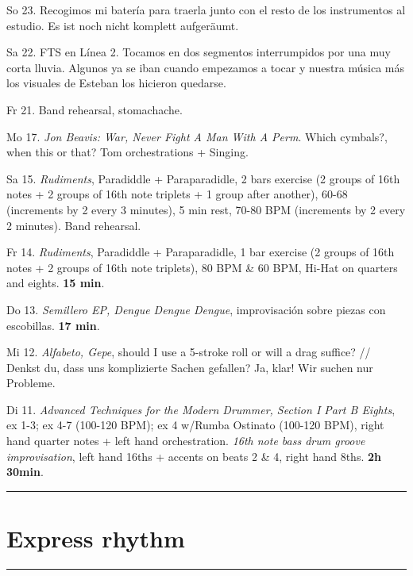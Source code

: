 \documentclass[
]{book}
\begin{document}
So 23. Recogimos mi batería para traerla junto con el resto de los instrumentos al estudio. Es ist noch nicht komplett aufgeräumt.

Sa 22. FTS en Línea 2. Tocamos en dos segmentos interrumpidos por una muy corta lluvia. Algunos ya se iban cuando empezamos a tocar y nuestra música más los visuales de Esteban los hicieron quedarse.

Fr 21. Band rehearsal, stomachache.

Mo 17. \emph{Jon Beavis: War, Never Fight A Man With A Perm}. Which cymbals?, when this or that? Tom orchestrations + Singing.

Sa 15. \emph{Rudiments}, Paradiddle + Paraparadidle, 2 bars exercise (2 groups of 16th notes + 2 groups of 16th note triplets + 1 group after another), 60-68 (increments by 2 every 3 minutes), 5 min rest, 70-80 BPM (increments by 2 every 2 minutes). Band rehearsal.

\hypertarget{okt152022}{}

Fr 14. \emph{Rudiments}, Paradiddle + Paraparadidle, 1 bar exercise (2 groups of 16th notes + 2 groups of 16th note triplets), 80 BPM \& 60 BPM, Hi-Hat on quarters and eights. \textbf{15 min}.

Do 13. \emph{Semillero EP, Dengue Dengue Dengue}, improvisación sobre piezas con escobillas. \textbf{17 min}.

Mi 12. \emph{Alfabeto, Gepe}, should I use a 5-stroke roll or will a drag suffice? // Denkst du, dass uns komplizierte Sachen gefallen? Ja, klar! Wir suchen nur Probleme.

Di 11. \emph{Advanced Techniques for the Modern Drummer, Section I Part B Eights}, ex 1-3; ex 4-7 (100-120 BPM); ex 4 w/Rumba Ostinato (100-120 BPM), right hand quarter notes + left hand orchestration. \emph{16th note bass drum groove improvisation}, left hand 16ths + accents on beats 2 \& 4, right hand 8ths. \textbf{2h 30min}.

\hypertarget{okt112022}{}

\begin{center}\rule{0.5\linewidth}{0.5pt}\end{center}

\hypertarget{Express-rhythm}{%
\chapter{Express rhythm}\label{Express-rhythm}}

\begin{center}\rule{0.5\linewidth}{0.5pt}\end{center}
\end{document}

